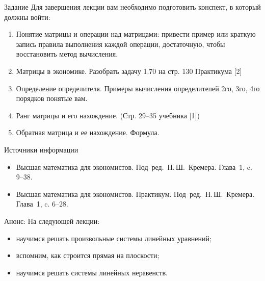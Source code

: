 \documentclass[unicode,11pt,notheorems]{beamer}
\begin{document}
\begin{frame}{Задание}
Для завершения лекции вам необходимо подготовить конспект, в который должны войти:
	\begin{enumerate}
		\item 
			Понятие матрицы и операции над матрицами: привести пример или краткую запись правила выполнения каждой операции, достаточную, чтобы восстановить метод вычисления.
		\item 
			Матрицы в экономике. Разобрать задачу 1.70 на стр. 130 Практикума [2]
		\item 
			Определение определителя. 
			Примеры вычисления определителей 2го, 3го, 4го порядков понятые вам. 
		\item 
			Ранг матрицы и его нахождение. (Стр. 29--35 учебника [1])
		\item 
			Обратная матрица и ее нахождение. Формула.
	\end{enumerate}
\end{frame}
\begin{frame}{Источники информации}
\begin{itemize}
\item 
	Высшая математика для экономистов. Под~ред.~Н.\,Ш.~Кремера. Глава~1, c. 9--38.
\item 
	Высшая математика для экономистов. Практикум. Под~ред.~Н.\,Ш.~Кремера. Глава~1, c. 6--28.
\end{itemize}

\end{frame}

\begin{frame}{Анонс:}
	На следующей лекции:
	\begin{itemize}
	\item 
		научимся решать произвольные системы линейных уравнений;
	\item 
		вспомним, как строится прямая на плоскости;
	\item 
		научимся решать системы линейных неравенств.
	\end{itemize}
\end{frame}
\end{document}
